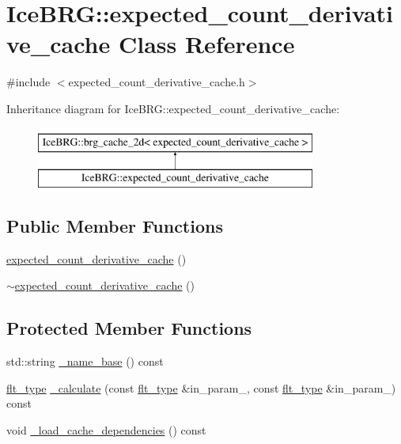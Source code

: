 \hypertarget{classIceBRG_1_1expected__count__derivative__cache}{}\section{Ice\+B\+R\+G\+:\+:expected\+\_\+count\+\_\+derivative\+\_\+cache Class Reference}
\label{classIceBRG_1_1expected__count__derivative__cache}


{\ttfamily \#include $<$expected\+\_\+count\+\_\+derivative\+\_\+cache.\+h$>$}

Inheritance diagram for Ice\+B\+R\+G\+:\+:expected\+\_\+count\+\_\+derivative\+\_\+cache\+:\begin{figure}[H]
\begin{center}
\leavevmode
\includegraphics[height=2.000000cm]{classIceBRG_1_1expected__count__derivative__cache}
\end{center}
\end{figure}
\subsection*{Public Member Functions}
\begin{DoxyCompactItemize}
\item 
\hyperlink{classIceBRG_1_1expected__count__derivative__cache_a63a6e862842c52e5bf31ffea28828733}{expected\+\_\+count\+\_\+derivative\+\_\+cache} ()
\item 
\hyperlink{classIceBRG_1_1expected__count__derivative__cache_a006d6761d4ad94e582a565079035ac17}{$\sim$expected\+\_\+count\+\_\+derivative\+\_\+cache} ()
\end{DoxyCompactItemize}
\subsection*{Protected Member Functions}
\begin{DoxyCompactItemize}
\item 
std\+::string \hyperlink{classIceBRG_1_1expected__count__derivative__cache_abb662544efc6301f169336a3cb6fa08a}{\+\_\+name\+\_\+base} () const 
\item 
\hyperlink{lib_2IceBRG__main_2common_8h_ad0f130a56eeb944d9ef2692ee881ecc4}{flt\+\_\+type} \hyperlink{classIceBRG_1_1expected__count__derivative__cache_abc9c512709d23669a982a40c8e0613cf}{\+\_\+calculate} (const \hyperlink{lib_2IceBRG__main_2common_8h_ad0f130a56eeb944d9ef2692ee881ecc4}{flt\+\_\+type} \&in\+\_\+param\+\_, const \hyperlink{lib_2IceBRG__main_2common_8h_ad0f130a56eeb944d9ef2692ee881ecc4}{flt\+\_\+type} \&in\+\_\+param\+\_) const 
\item 
void \hyperlink{classIceBRG_1_1expected__count__derivative__cache_a3f883c9118416c4bca3fbca8327a6267}{\+\_\+load\+\_\+cache\+\_\+dependencies} () const 
\end{DoxyCompactItemize}
